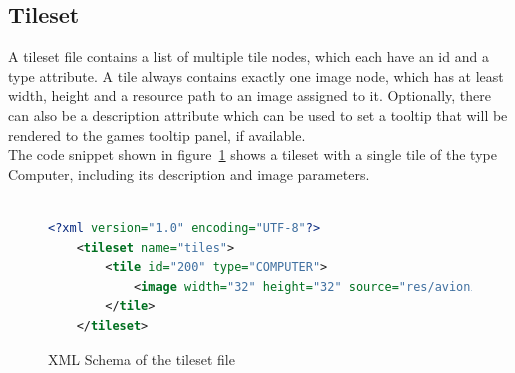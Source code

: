 \subsection{Tileset}\label{subsec:tileset}
A tileset file contains a list of multiple tile nodes, which each have an id and a type attribute.
A tile always contains exactly one image node, which has at least width, height and a resource path to an image assigned to it.
Optionally, there can also be a description attribute which can be used to set a tooltip that will be rendered to the games tooltip panel, if available.
\\
The code snippet shown in figure~\ref{fig:xml-tileset} shows a tileset with a single tile of the type Computer, including its description and image parameters.
\\ \\
\begin{figure}
\begin{lstlisting}[language=XML,label={lst:tileset-xml}]
    <?xml version="1.0" encoding="UTF-8"?>
    <tileset name="tiles">
        <tile id="200" type="COMPUTER">
            <image width="32" height="32" source="res/avionics/default.png" description="Default CPU Component"/>
        </tile>
    </tileset>
\end{lstlisting}
    \caption{XML Schema of the tileset file}
    \label{fig:xml-tileset}
\end{figure}
